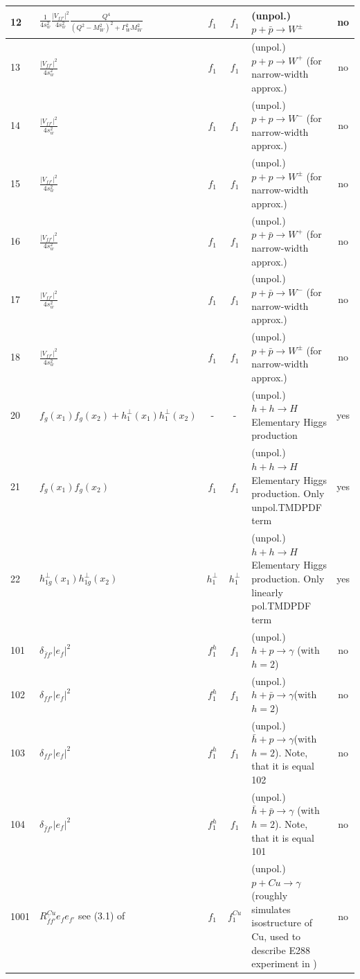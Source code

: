 \documentclass[prd,nofootinbib,eqsecnum,final]{revtex4}
\newcommand{\Ds}{\displaystyle}
\renewcommand{\(}{\left(}
\renewcommand{\)}{\right)}
\renewcommand{\[}{\left[}
\renewcommand{\]}{\right]}
\begin{document}
\begin{center}
\begin{longtable}{||l|p{6cm}|c|c||p{7cm}|c||}
\\\hline
12 & $\Ds \frac{1}{4s_w^2}\frac{|V_{f f'}|^2}{4s_w^2}\frac{Q^4}{(Q^2-M_W^2)^2+\Gamma_W^2M_W^2}$ & $f_1$ & $f_1$ & (unpol.)$p+\bar p\to W^\pm$ & no
\\\hline
13 & $\Ds \frac{|V_{f f'}|^2}{4s_w^2}$  & $f_1$ & $f_1$ & (unpol.)$p+p\to W^+$ (for narrow-width approx.) & no
\\\hline
14 & $\Ds \frac{|V_{f f'}|^2}{4s_w^2}$  & $f_1$ & $f_1$ & (unpol.)$p+p\to W^-$ (for narrow-width approx.) & no
\\\hline
15 & $\Ds \frac{|V_{f f'}|^2}{4s_w^2}$  & $f_1$ & $f_1$ & (unpol.)$p+p\to W^\pm$ (for narrow-width approx.) & no
\\\hline
16 & $\Ds \frac{|V_{f f'}|^2}{4s_w^2}$ & $f_1$ & $f_1$ & (unpol.)$p+\bar p\to W^+$ (for narrow-width approx.) & no
\\\hline
17 & $\Ds \frac{|V_{f f'}|^2}{4s_w^2}$ & $f_1$ & $f_1$ & (unpol.)$p+\bar p\to W^-$ (for narrow-width approx.) & no
\\\hline
18 & $\Ds \frac{|V_{f f'}|^2}{4s_w^2}$ & $f_1$ & $f_1$ & (unpol.)$p+\bar p\to W^\pm $ (for narrow-width approx.) & no
\\\hline
20 & $\Ds f_g(x_1)f_g(x_2)+h^\perp_{1}(x_1)h^\perp_{1}(x_2)$ & - & - & (unpol.)$h+h\to H$ Elementary Higgs production & yes
\\\hline
21 & $\Ds f_g(x_1)f_g(x_2)$ & $f_1$ & $f_{1}$ & (unpol.)$h+h\to H$ Elementary Higgs production. Only unpol.TMDPDF term & yes
\\\hline
22 & $\Ds h^\perp_{1g}(x_1)h^\perp_{1g}(x_2)$ & $h^\perp_{1}$ & $h^\perp_{1}$ & (unpol.)$h+h\to H$ Elementary Higgs production. Only linearly pol.TMDPDF term & yes
\\\hline
101 & $\delta_{\bar f f'}|e_f|^2$ & $f^h_1$ & $f_1$ & (unpol.)$h+p\to\gamma$ (with $h=2$) & no
\\\hline
102 & $\delta_{f f'}|e_f|^2$ & $f^h_1$ & $f_1$ & (unpol.)$h+\bar p\to\gamma$(with $h=2$) & no
\\\hline
103 & $\delta_{f f'}|e_f|^2$ & $f^h_1$ & $f_1$ & (unpol.)$\bar h+p\to\gamma$(with $h=2$). Note, that it is equal 102 & no
\\\hline
104 & $\delta_{\bar f f'}|e_f|^2$ & $f^h_1$ & $f_1$ & (unpol.)$\bar h+\bar p\to\gamma$ (with $h=2$). Note, that it is equal 101 & no
\\\hline
1001 & $\Ds R^{Cu}_{\bar f f'}e_f e_{f'} $ see (3.1) of \cite{Scimemi:2017etj} & $f_1$ & $f^{Cu}_1$ & (unpol.)$p+Cu\to \gamma$ (roughly simulates isostructure of Cu, used to describe E288 experiment in \cite{Scimemi:2017etj}) & no

\end{longtable}
\end{center}
\end{document}
